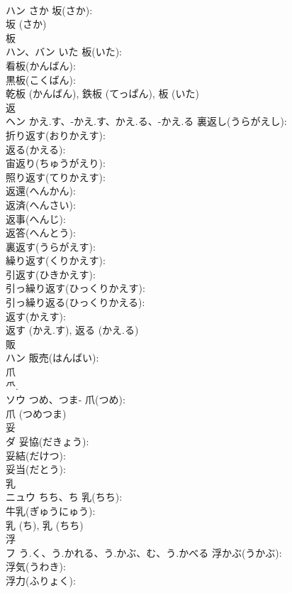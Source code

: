 \documentclass[8pt]{extreport}
\begin{document}
\begin{CJK}{UTF8}{min}
\\	ハン	さか	坂(さか): 
\\	坂 (さか)
\\	板			
\\	ハン、バン	いた	板(いた): 
\\	看板(かんばん): 
\\	黒板(こくばん): 
\\	乾板 (かんばん), 鉄板 (てっぱん), 板 (いた)
\\	返			
\\	ヘン	かえ.す、-かえ.す、かえ.る、-かえ.る	裏返し(うらがえし): 
\\	折り返す(おりかえす): 
\\	返る(かえる): 
\\	宙返り(ちゅうがえり): 
\\	照り返す(てりかえす): 
\\	返還(へんかん): 
\\	返済(へんさい): 
\\	返事(へんじ): 
\\	返答(へんとう): 
\\	裏返す(うらがえす): 
\\	繰り返す(くりかえす): 
\\	引返す(ひきかえす): 
\\	引っ繰り返す(ひっくりかえす): 
\\	引っ繰り返る(ひっくりかえる): 
\\	返す(かえす): 
\\	返す (かえ.す), 返る (かえ.る)
\\	販			
\\	ハン		販売(はんばい): 
\\	爪			
\\	⺥.	
\\	ソウ	つめ、つま-	爪(つめ): 
\\	爪 (つめつま)
\\	妥			
\\	ダ		妥協(だきょう): 
\\	妥結(だけつ): 
\\	妥当(だとう): 
\\	乳			
\\	ニュウ	ちち、ち	乳(ちち): 
\\	牛乳(ぎゅうにゅう): 
\\	乳 (ち), 乳 (ちち)
\\	浮			
\\	フ	う.く、う.かれる、う.かぶ、む、う.かべる	浮かぶ(うかぶ): 
\\	浮気(うわき): 
\\	浮力(ふりょく): 

\end{CJK}
\end{document}

